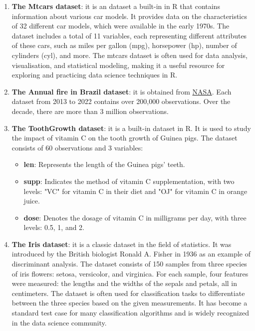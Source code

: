 \documentclass{article}\usepackage[]{graphicx}\usepackage[]{xcolor}
\begin{document}
\begin{enumerate}
\item \textbf{The Mtcars dataset}: it is an dataset a built-in in R that contains information about various car models. It provides data on the characteristics of 32 different car models, which were available in the early 1970s. The dataset includes a total of 11 variables, each representing different attributes of these cars, such as miles per gallon (mpg), horsepower (hp), number of cylinders (cyl), and more. The mtcars dataset is often used for data analysis, visualisation, and statistical modeling, making it a useful resource for exploring and practicing data science techniques in R.\\

\item \textbf{The Annual fire in Brazil dataset}: it is obtained from \href{https://firms.modaps.eosdis.nasa.gov/}{NASA}. Each dataset from 2013 to 2022 contains over 200,000 observations. Over the decade, there are more than 3 million observations.\\

\item \textbf{The ToothGrowth dataset}: it is a built-in dataset in R. It is used to study the impact of vitamin C on the tooth growth of Guinea pigs. The dataset consists of 60 observations and 3 variables:

\begin{itemize}
    \item \textbf{len}: Represents the length of the Guinea pigs' teeth.
    \item \textbf{supp}: Indicates the method of vitamin C supplementation, with two levels: "VC" for vitamin C in their diet and "OJ" for vitamin C in orange juice.
    \item \textbf{dose}: Denotes the dosage of vitamin C in milligrams per day, with three levels: 0.5, 1, and 2.
\end{itemize}

\item \textbf{The Iris dataset}: it is a classic dataset in the field of statistics. It was introduced by the British biologist Ronald A. Fisher in 1936 as an example of discriminant analysis. The dataset consists of 150 samples from three species of iris flowers: setosa, versicolor, and virginica. For each sample, four features were measured: the lengths and the widths of the sepals and petals, all in centimeters. The dataset is often used for classification tasks to differentiate between the three species based on the given measurements. It has become a standard test case for many classification algorithms and is widely recognized in the data science community.



\end{enumerate}
\end{document}

